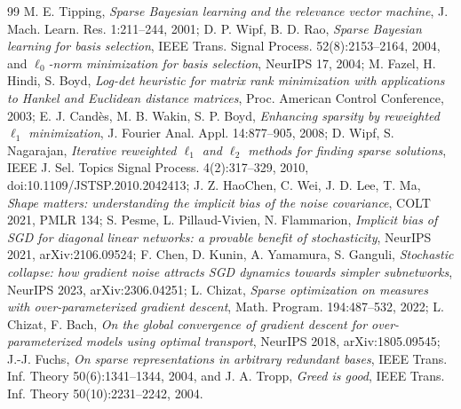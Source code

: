 \begin{thebibliography}{99}
M. E. Tipping, \emph{Sparse Bayesian learning and the relevance vector machine}, J. Mach. Learn. Res. 1:211--244, 2001;
D. P. Wipf, B. D. Rao, \emph{Sparse Bayesian learning for basis selection}, IEEE Trans. Signal Process.
52(8):2153--2164, 2004, and \emph{$\ell_0$-norm minimization for basis selection}, NeurIPS 17, 2004;
M. Fazel, H. Hindi, S. Boyd, \emph{Log-det heuristic for matrix rank minimization with applications to Hankel and
Euclidean distance matrices}, Proc. American Control Conference, 2003;
E. J. Cand\`es, M. B. Wakin, S. P. Boyd, \emph{Enhancing sparsity by reweighted $\ell_1$ minimization}, J. Fourier Anal.
Appl. 14:877--905, 2008;
D. Wipf, S. Nagarajan, \emph{Iterative reweighted $\ell_1$ and $\ell_2$ methods for finding sparse solutions}, IEEE J.
Sel. Topics Signal Process. 4(2):317--329, 2010, doi:10.1109/JSTSP.2010.2042413;
J. Z. HaoChen, C. Wei, J. D. Lee, T. Ma, \emph{Shape matters: understanding the implicit bias of the noise covariance},
COLT 2021, PMLR 134;
S. Pesme, L. Pillaud-Vivien, N. Flammarion, \emph{Implicit bias of SGD for diagonal linear networks: a provable benefit
of stochasticity}, NeurIPS 2021, arXiv:2106.09524;
F. Chen, D. Kunin, A. Yamamura, S. Ganguli, \emph{Stochastic collapse: how gradient noise attracts SGD dynamics towards
simpler subnetworks}, NeurIPS 2023, arXiv:2306.04251;
L. Chizat, \emph{Sparse optimization on measures with over-parameterized gradient descent}, Math. Program.
194:487--532, 2022;
L. Chizat, F. Bach, \emph{On the global convergence of gradient descent for over-parameterized models using optimal
transport}, NeurIPS 2018, arXiv:1805.09545;
J.-J. Fuchs, \emph{On sparse representations in arbitrary redundant bases}, IEEE Trans. Inf. Theory 50(6):1341--1344,
2004, and J. A. Tropp, \emph{Greed is good}, IEEE Trans. Inf. Theory 50(10):2231--2242, 2004.


\end{thebibliography}
